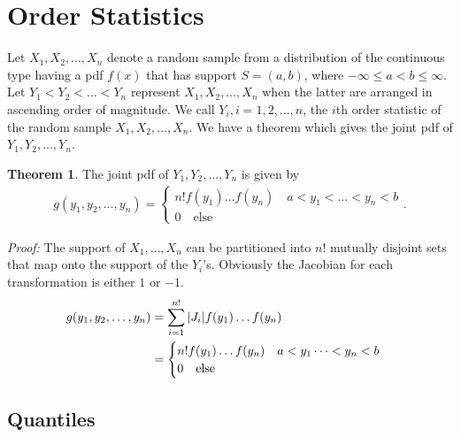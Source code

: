 \documentclass{book}
\theoremstyle{definition}
\newtheorem{thm}{Theorem}[section]
\newcommand{\nn}{\nonumber}
\newcommand{\Else}{\text{else}}
\begin{document}
\section{Order Statistics}


Let $X_1, X_2,\dots,X_n$ denote a random sample from a distribution of the continuous type having a pdf $f(x)$ that has support $S = (a, b)$, where $−\infty \leq a<b \leq \infty$. Let $Y_1 < Y_2 < \dots < Y_n$ represent $X_1, X_2,\dots,X_n$ when the latter are arranged in ascending order of magnitude. We call $Y_i, i = 1, 2,...,n$, the $i$th order statistic of the random sample $X_1, X_2,\dots,X_n$. We have a theorem which gives the joint pdf of $Y_1,Y_2,\dots,Y_n$.\\

\begin{thm} The joint pdf of $Y_1, Y_2, \dots, Y_n$ is given by
\begin{align}
g(y_1, y_2, \dots, y_n) = \begin{cases}
n!f(y_1)\dots f(y_n)\quad a < y_1 < \dots < y_n <b\\
0 \quad \Else
\end{cases}.
\end{align}
\end{thm}
\textit{Proof:} The support of $X_1,\dots,X_n$ can be partitioned into $n!$ mutually disjoint sets that map onto the support of the $Y_i$'s. Obviously the Jacobian for each transformation is either $1$ or $-1$. 
\begin{align}
g(y_1,y_2,\dots,y_n) &= \sum^{n!}_{i=1}\abs{J_i}f(y_1)\dots f(y_n)\nn\\
&= \begin{cases}
n! f(y_1)\dots f(y_n)\quad a < y_1 \dots < y_n < b\\
0 \quad \Else
\end{cases}
\end{align}




















\subsection{Quantiles}
\end{document}
